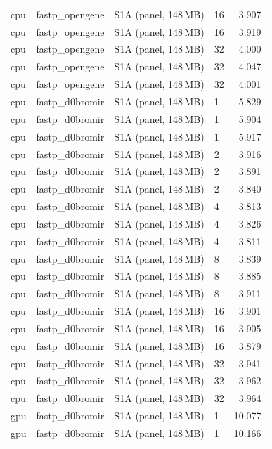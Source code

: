 \documentclass[a4paper,12pt]{article}
\begin{document}
\begin{longtable}{llllr}
  cpu & fastp\_opengene & S1A (panel, 148\,MB) & 16 & 3.907 \\
  cpu & fastp\_opengene & S1A (panel, 148\,MB) & 16 & 3.919 \\
  cpu & fastp\_opengene & S1A (panel, 148\,MB) & 32 & 4.000 \\
  cpu & fastp\_opengene & S1A (panel, 148\,MB) & 32 & 4.047 \\
  cpu & fastp\_opengene & S1A (panel, 148\,MB) & 32 & 4.001 \\
  cpu & fastp\_d0bromir & S1A (panel, 148\,MB) & 1  & 5.829 \\
  cpu & fastp\_d0bromir & S1A (panel, 148\,MB) & 1  & 5.904 \\
  cpu & fastp\_d0bromir & S1A (panel, 148\,MB) & 1  & 5.917 \\
  cpu & fastp\_d0bromir & S1A (panel, 148\,MB) & 2  & 3.916 \\
  cpu & fastp\_d0bromir & S1A (panel, 148\,MB) & 2  & 3.891 \\
  cpu & fastp\_d0bromir & S1A (panel, 148\,MB) & 2  & 3.840 \\
  cpu & fastp\_d0bromir & S1A (panel, 148\,MB) & 4  & 3.813 \\
  cpu & fastp\_d0bromir & S1A (panel, 148\,MB) & 4  & 3.826 \\
  cpu & fastp\_d0bromir & S1A (panel, 148\,MB) & 4  & 3.811 \\
  cpu & fastp\_d0bromir & S1A (panel, 148\,MB) & 8  & 3.839 \\
  cpu & fastp\_d0bromir & S1A (panel, 148\,MB) & 8  & 3.885 \\
  cpu & fastp\_d0bromir & S1A (panel, 148\,MB) & 8  & 3.911 \\
  cpu & fastp\_d0bromir & S1A (panel, 148\,MB) & 16 & 3.901 \\
  cpu & fastp\_d0bromir & S1A (panel, 148\,MB) & 16 & 3.905 \\
  cpu & fastp\_d0bromir & S1A (panel, 148\,MB) & 16 & 3.879 \\
  cpu & fastp\_d0bromir & S1A (panel, 148\,MB) & 32 & 3.941 \\
  cpu & fastp\_d0bromir & S1A (panel, 148\,MB) & 32 & 3.962 \\
  cpu & fastp\_d0bromir & S1A (panel, 148\,MB) & 32 & 3.964 \\
  gpu & fastp\_d0bromir & S1A (panel, 148\,MB) & 1  & 10.077 \\
  gpu & fastp\_d0bromir & S1A (panel, 148\,MB) & 1  & 10.166 \\

\end{longtable}
\end{document}
